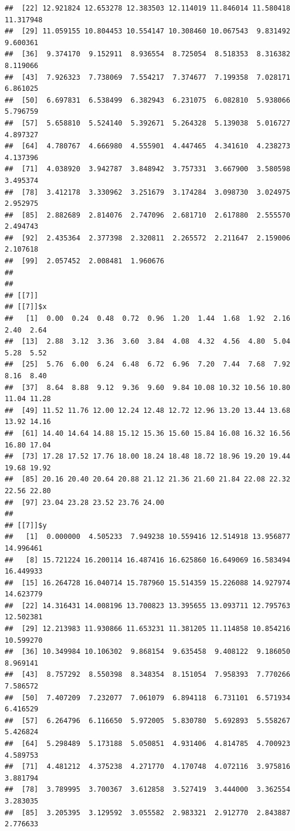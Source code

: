 \documentclass[
  ignorenonframetext,
]{beamer}
\begin{document}
\begin{frame}[fragile]{}
\begin{verbatim}
##  [22] 12.921824 12.653278 12.383503 12.114019 11.846014 11.580418 11.317948
##  [29] 11.059155 10.804453 10.554147 10.308460 10.067543  9.831492  9.600361
##  [36]  9.374170  9.152911  8.936554  8.725054  8.518353  8.316382  8.119066
##  [43]  7.926323  7.738069  7.554217  7.374677  7.199358  7.028171  6.861025
##  [50]  6.697831  6.538499  6.382943  6.231075  6.082810  5.938066  5.796759
##  [57]  5.658810  5.524140  5.392671  5.264328  5.139038  5.016727  4.897327
##  [64]  4.780767  4.666980  4.555901  4.447465  4.341610  4.238273  4.137396
##  [71]  4.038920  3.942787  3.848942  3.757331  3.667900  3.580598  3.495374
##  [78]  3.412178  3.330962  3.251679  3.174284  3.098730  3.024975  2.952975
##  [85]  2.882689  2.814076  2.747096  2.681710  2.617880  2.555570  2.494743
##  [92]  2.435364  2.377398  2.320811  2.265572  2.211647  2.159006  2.107618
##  [99]  2.057452  2.008481  1.960676
## 
## 
## [[7]]
## [[7]]$x
##   [1]  0.00  0.24  0.48  0.72  0.96  1.20  1.44  1.68  1.92  2.16  2.40  2.64
##  [13]  2.88  3.12  3.36  3.60  3.84  4.08  4.32  4.56  4.80  5.04  5.28  5.52
##  [25]  5.76  6.00  6.24  6.48  6.72  6.96  7.20  7.44  7.68  7.92  8.16  8.40
##  [37]  8.64  8.88  9.12  9.36  9.60  9.84 10.08 10.32 10.56 10.80 11.04 11.28
##  [49] 11.52 11.76 12.00 12.24 12.48 12.72 12.96 13.20 13.44 13.68 13.92 14.16
##  [61] 14.40 14.64 14.88 15.12 15.36 15.60 15.84 16.08 16.32 16.56 16.80 17.04
##  [73] 17.28 17.52 17.76 18.00 18.24 18.48 18.72 18.96 19.20 19.44 19.68 19.92
##  [85] 20.16 20.40 20.64 20.88 21.12 21.36 21.60 21.84 22.08 22.32 22.56 22.80
##  [97] 23.04 23.28 23.52 23.76 24.00
## 
## [[7]]$y
##   [1]  0.000000  4.505233  7.949238 10.559416 12.514918 13.956877 14.996461
##   [8] 15.721224 16.200114 16.487416 16.625860 16.649069 16.583494 16.449933
##  [15] 16.264728 16.040714 15.787960 15.514359 15.226088 14.927974 14.623779
##  [22] 14.316431 14.008196 13.700823 13.395655 13.093711 12.795763 12.502381
##  [29] 12.213983 11.930866 11.653231 11.381205 11.114858 10.854216 10.599270
##  [36] 10.349984 10.106302  9.868154  9.635458  9.408122  9.186050  8.969141
##  [43]  8.757292  8.550398  8.348354  8.151054  7.958393  7.770266  7.586572
##  [50]  7.407209  7.232077  7.061079  6.894118  6.731101  6.571934  6.416529
##  [57]  6.264796  6.116650  5.972005  5.830780  5.692893  5.558267  5.426824
##  [64]  5.298489  5.173188  5.050851  4.931406  4.814785  4.700923  4.589753
##  [71]  4.481212  4.375238  4.271770  4.170748  4.072116  3.975816  3.881794
##  [78]  3.789995  3.700367  3.612858  3.527419  3.444000  3.362554  3.283035
##  [85]  3.205395  3.129592  3.055582  2.983321  2.912770  2.843887  2.776633

\end{verbatim}
\end{frame}
\end{document}
